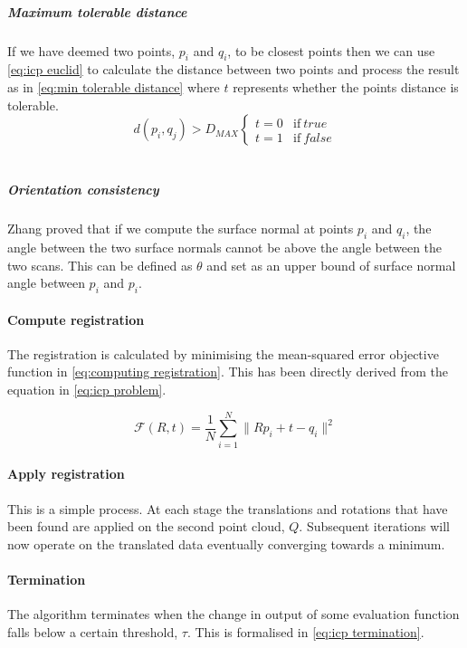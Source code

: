 \subparagraph{Maximum tolerable distance}
If we have deemed two points, $p_i$ and $q_i$, to be closest points then we can use \ref{eq:icp euclid} to calculate the distance between two points and process the result as in \ref{eq:min tolerable distance} where $t$ represents whether the points distance is tolerable. \\

\begin{equation}
    \label{eq:min tolerable distance}
    d(p_i,q_j) > D_{MAX}
        \begin{cases} 
        t=0 & \mbox{if} \ true \\
        t=1 & \mbox{if} \ false
        \end{cases}
\end{equation} \\

\subparagraph{Orientation consistency}
Zhang proved that if we compute the surface normal at points $p_i$ and $q_i$, the angle between the two surface normals cannot be above the angle between the two scans. This can be defined as $\theta$ and set as an upper bound of surface normal angle between $p_i$ and $p_i$. \\

\paragraph{Compute registration}
The registration is calculated by minimising the mean-squared error objective function in \ref{eq:computing registration}. This has been directly derived from the equation in \ref{eq:icp problem}.

\begin{equation}
    \label{eq:computing registration}
    \mathcal{F}(R,t) = \frac{1}{N}\sum\limits_{i=1}^N\|Rp_i+t-q_i\|^2
\end{equation}

\paragraph{Apply registration}
This is a simple process. At each stage the translations and rotations that have been found are applied on the second point cloud, $Q$. Subsequent iterations will now operate on the translated data eventually converging towards a minimum. \\

\paragraph{Termination}
The algorithm terminates when the change in output of some evaluation function falls below a certain threshold, $\tau$. This is formalised in \ref{eq:icp termination}. \\

